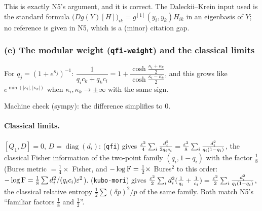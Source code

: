 \documentclass[11pt]{article}
\begin{document}
This is exactly N5's argument, and it is correct.  The Daleckii--Krein input used is the standard
formula $\bigl(Dg(Y)[H]\bigr)_{ik}=g^{[1]}(y_i,y_k)H_{ik}$ in an eigenbasis of $Y$; no reference
is given in N5, which is a (minor) citation gap.

\subsubsection*{(e) The modular weight (\texttt{qfi-weight}) and the classical limits}
\begin{lemma}
For $q_j=(1+e^{\kappa_j})^{-1}$:
$\dfrac1{q_ic_k+q_kc_i}=1+\dfrac{\cosh\frac{\kappa_i+\kappa_k}2}{\cosh\frac{\kappa_i-\kappa_k}2}$,
and this grows like $e^{\min(|\kappa_i|,|\kappa_k|)}$ when $\kappa_i,\kappa_k\to\pm\infty$ with
the same sign.
\end{lemma}
Machine check (sympy): the difference simplifies to $0$.

\paragraph{Classical limits.}
$[Q_1,D]=0$, $D=\operatorname{diag}(d_i)$:
(\texttt{qfi}) gives $\frac{\varepsilon^2}4\sum_i\frac{d_i^2}{2q_ic_i}=\frac{\varepsilon^2}8\sum_i\frac{d_i^2}{q_i(1-q_i)}$,
the classical Fisher information of the two-point family $(q_i,1-q_i)$ with the factor $\tfrac18$
(Bures metric $=\tfrac14\times$ Fisher, and $-\log\operatorname{F}=\tfrac12\times$ Bures$^2$ to this order:
$-\log\operatorname{F}=\tfrac18\sum d_i^2/(q_ic_i)\varepsilon^2$).  (\texttt{kubo-mori}) gives
$\frac{\varepsilon^2}2\sum_id_i^2(\frac1{q_i}+\frac1{c_i})=\frac{\varepsilon^2}2\sum_i\frac{d_i^2}{q_i(1-q_i)}$,
the classical relative entropy $\tfrac12\sum(\delta p)^2/p$ of the same family.  Both match N5's
``familiar factors $\tfrac18$ and $\tfrac12$''.
\end{document}
